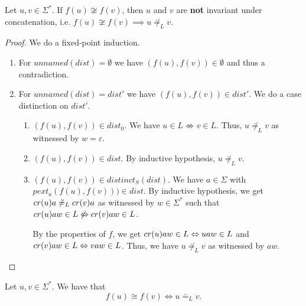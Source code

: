 \begin{lemma}
    \label{distinct_final}
    Let $u,v \in \Sigma^*$. 
    If $f(u) \not\cong f(v)$, then $u$ and $v$ are \textbf{not} invariant under concatenation, i.e. $f(u) \not\cong f(v) \implies u \not\doteq_L v$.
\end{lemma}
\begin{proof}
    We do a fixed-point induction.
    \begin{enumerate}
        \item For $\mathit{unnamed}(\mathit{dist}) = \emptyset$ we have $(f(u), f(v)) \in \emptyset$ and thus a contradiction. 
        \item For $\mathit{unnamed}(\mathit{dist}) = \mathit{dist'}$ we have $(f(u), f(v)) \in \mathit{dist'}$. 
            We do a case distinction on $\mathit{dist'}$.
            \begin{enumerate}
                \item $(f(u), f(v)) \in \mathit{dist_0}$.
                    We have $u \in L \not\Leftrightarrow v \in L$. 
                    Thus, $u \not\doteq_L v$ as witnessed by $w=\varepsilon$.
                \item $(f(u), f(v)) \in \mathit{dist}$. 
                    By inductive hypothesis, $u \not\doteq_L v$.
                \item $(f(u), f(v)) \in \mathit{distinct_S}(\mathit{dist})$.
                    We have $a \in \Sigma$ with $\mathit{pext_a}(f(u), f(v))) \in \mathit{dist}$.
                    By inductive hypothesis, we get $cr(u)a \not\doteq_L cr(v)a$ 
                    as witnessed by $w \in \Sigma^*$ 
                    such that $cr(u)aw \in L \not\Leftrightarrow cr(v)aw \in L$.

                    By the properties of $f$, we get $cr(u)aw \in L \Leftrightarrow uaw \in L$ and $cr(v)aw \in L \Leftrightarrow vaw \in L$.
                    Thus, we have $u \not\doteq_L v$ as witnessed by $aw$.
            \end{enumerate}
    \end{enumerate}
\end{proof}


\begin{corollary}
    \label{equivP}
    Let $u, v \in \Sigma^*$. We have that
    \begin{equation*}
        f(u) \cong f(v) \iff u \doteq_L v.
    \end{equation*}
\end{corollary}

